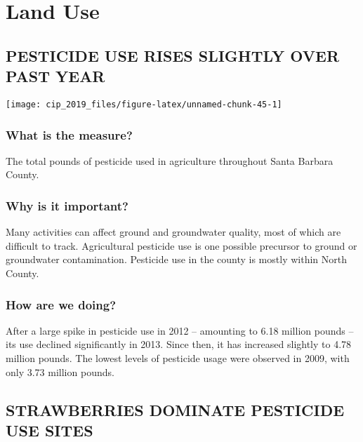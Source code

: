 \documentclass[]{book}
\theoremstyle{definition}
\theoremstyle{definition}
\theoremstyle{definition}
\theoremstyle{remark}
\begin{document}
\section*{Land Use}\label{land-use}

\subsection*{PESTICIDE USE RISES SLIGHTLY OVER PAST
YEAR}\label{pesticide-use-rises-slightly-over-past-year}

\texttt{[image: cip\_2019\_files/figure-latex/unnamed-chunk-45-1]}

\subsubsection*{What is the measure?}\label{what-is-the-measure-20}

The total pounds of pesticide used in agriculture throughout Santa
Barbara County.

\subsubsection*{Why is it important?}\label{why-is-it-important-19}

Many activities can affect ground and groundwater quality, most of which
are difficult to track. Agricultural pesticide use is one possible
precursor to ground or groundwater contamination. Pesticide use in the
county is mostly within North County.

\subsubsection*{How are we doing?}\label{how-are-we-doing-26}

After a large spike in pesticide use in 2012 -- amounting to 6.18
million pounds -- its use declined significantly in 2013. Since then, it
has increased slightly to 4.78 million pounds. The lowest levels of
pesticide usage were observed in 2009, with only 3.73 million pounds.

\subsection*{STRAWBERRIES DOMINATE PESTICIDE USE
SITES}\label{strawberries-dominate-pesticide-use-sites}
\end{document}
